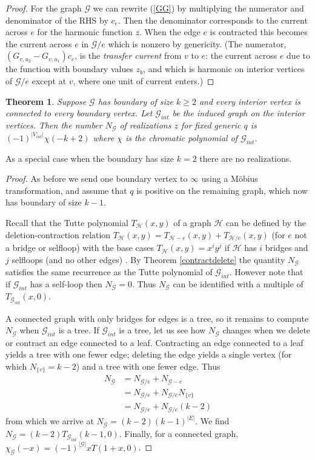 \documentclass[12pt]{amsart}
\newtheorem{theorem}{Theorem}
\newcommand{\G}{{\mathcal G}}
\renewcommand{\H}{{\mathcal H}}
\begin{document}
\begin{proof}
For the graph $\G$ we can rewrite (\ref{GG}) by multiplying the numerator and denominator of the RHS 
by $c_e$. Then the denominator
corresponds to the current across $e$ for the harmonic function $z$. When the edge $e$ is contracted this
becomes the current across $e$ in $\G/e$ which is nonzero
by genericity. (The numerator, $(G_{v,u_2}-G_{v,u_1})c_e$,
is the \emph{transfer current} from $v$ to $e$:
the current across $e$ due to the function with boundary values $z_b$, and which is harmonic on interior vertices of $\G/e$ except at $v$, where one unit of current enters.)
\end{proof}

\begin{theorem}\label{tuttethm}Suppose $\G$ has boundary of size $k\ge 2$ and every interior vertex is connected to every boundary vertex. Let $\G_{int}$ be the induced graph on the interior vertices.
Then the number $N_{\G}$ of realizations $z$ for fixed generic $q$ is $(-1)^{|V_{int}|}\chi(-k+2)$ where $\chi$ 
is the chromatic polynomial of $\G_{int}$.
\end{theorem}

As a special case when the boundary has size $k=2$ there are no realizations.

\begin{proof} As before we send one boundary vertex to $\infty$ using a M\"obius transformation,
and assume that $q$ is positive on the remaining graph, which now has boundary of size $k-1$.

Recall that the Tutte polynomial $T_{\H}(x,y)$ of a graph $\H$ can be defined by the deletion-contraction relation 
$T_{\H}(x,y)=T_{\H-e}(x,y) + T_{\H/e}(x,y)$ 
(for $e$ not a bridge or selfloop)
with the base cases
$T_{\H}(x,y)= x^iy^j$ if $\H$ has $i$ bridges and $j$ selfloops (and no other edges) \cite{Tuttepoly}. 
By Theorem \ref{contractdelete} the quantity $N_{\G}$
satisfies the same recurrence as the Tutte polynomial of $\G_{int}$. However note that
if $\G_{int}$ has a self-loop then $N_{\G}=0$. 
Thus $N_{\G}$ can be identified with a multiple of $T_{\G_{int}}(x,0)$. 

A connected graph with only bridges for edges is a tree,
so it remains to compute $N_{\G}$ when $\G_{int}$ is a tree.
If $\G_{int}$ is a tree, let us see how $N_{\G}$ changes when we delete or contract an edge connected to a leaf.
Contracting an edge connected to a leaf yields a tree with one fewer edge; deleting the edge
yields a single vertex (for which $N_{\{v\}}=k-2$) and a tree with one fewer edge. Thus
\begin{align*}N_{\G} &= N_{\G/e} + N_{\G-e}\\
&= N_{\G/e} + N_{\G/e}N_{\{v\}}\\
&= N_{\G/e} + N_{\G/e}(k-2)
\end{align*} 
from which we arrive at 
$N_{\G} = (k-2)(k-1)^{|E|}$. 
We find $N_{\G} =(k-2)T_{\G_{int}}(k-1,0)$. Finally, for a connected graph,
$\chi_{\G}(-x) = (-1)^{|\G|}xT(1+x,0)$.
\end{proof}
\end{document}
